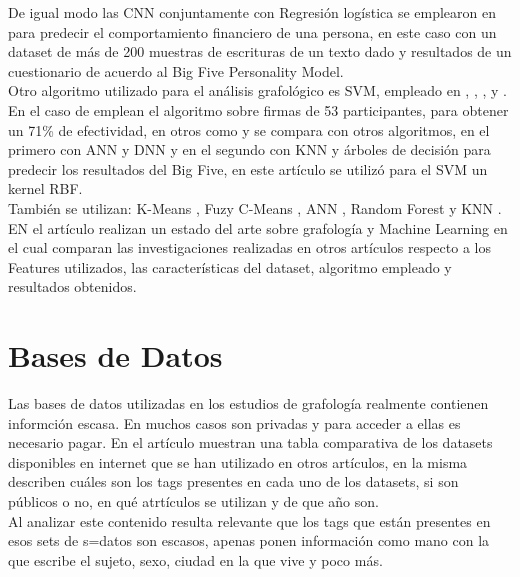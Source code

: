 \documentclass[10pt, a4paper]{article}
\begin{document}
De igual modo las CNN conjuntamente con Regresi\'on log\'istica se emplearon en \cite{4} para predecir el comportamiento financiero de una persona, en este caso con un dataset de más de 200 muestras de escrituras de un texto dado y resultados de un cuestionario de acuerdo al Big Five Personality Model.\\ 

Otro algoritmo utilizado para el an\'alisis grafol\'ogico es SVM, empleado en \cite{2}, \cite{5}, \cite{6}, \cite{7} y \cite{8}. En el caso de \cite{6} emplean el algoritmo sobre firmas de 53 participantes, para obtener un 71\% de efectividad, 
en otros como \cite{5} y \cite{8} se compara con otros algoritmos, en el primero con ANN y DNN y en el segundo con KNN y \'arboles de decisi\'on para predecir los resultados del Big Five, en este art\'iculo se utiliz\'o para el SVM un kernel RBF.\\ 

Tambi\'en se utilizan: K-Means \cite{9}, Fuzy C-Means \cite{10}, ANN \cite{11,5,12,9}, Random Forest \cite{13, 14} y KNN \cite{14,9,8}.\\

EN el art\'iculo \cite{18} realizan un estado del arte sobre grafolog\'ia y Machine Learning en el cual comparan las investigaciones realizadas en 
otros art\'iculos respecto a los Features utilizados, las caracter\'isticas del dataset, algoritmo empleado y resultados obtenidos.

\section{Bases de Datos}

Las bases de datos utilizadas en los estudios de grafolog\'ia realmente contienen informci\'on escasa. En muchos casos 
son privadas y para acceder a ellas es necesario pagar. En el art\'iculo \cite{14} muestran una tabla comparativa de los datasets disponibles en 
internet que se han utilizado en otros art\'iculos, en la misma describen cu\'ales son los tags presentes en cada uno de los datasets, si son p\'ublicos o no, en qu\'e atrt\'iculos se utilizan y 
de que a\~no son. \\ 

Al analizar este contenido resulta relevante que los tags que est\'an presentes en esos sets de s=datos son escasos, apenas ponen informaci\'on como mano con la que escribe el sujeto, sexo, 
ciudad en la que vive y poco m\'as. \\ 
\end{document}
